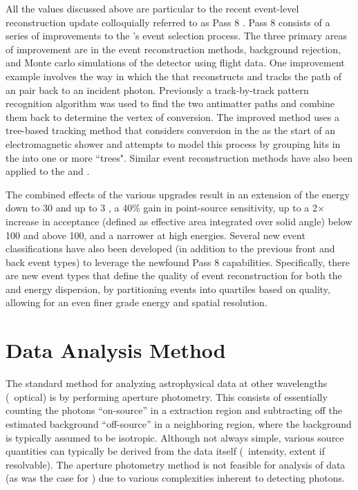 All the values discussed above are particular to the recent \lat{} event-level reconstruction update colloquially referred to as Pass 8 \citep{atwood13}. Pass 8 consists of a series of improvements to the \lat{}'s event selection process. The three primary areas of improvement are in the event reconstruction methods, background rejection, and Monte carlo simulations of the detector using flight data. One improvement example involves the way in which the that \lat{} reconstructs and tracks the path of an \ee{} pair back to an incident photon. Previously a track-by-track pattern recognition algorithm was used to find the two antimatter paths and combine them back to determine the vertex of conversion. The improved method uses a tree-based tracking method that considers conversion in the \tkr{} as the start of an electromagnetic shower and attempts to model this process by grouping hits in the \tkr{} into one or more ``trees". Similar event reconstruction methods have also been applied to the \acd{} and \calo{}. 

The combined effects of the various upgrades result in an extension of the energy down to 30\mev{} and up to 3\tev{} \cite[see Chapter \ref{chap:2FHL} for applications]{Bruel12}, a 40\% gain in point-source sensitivity, up to a 2$\times$ increase in acceptance (defined as effective area integrated over solid angle) below 100\mev{} and above 100\gev{}, and a narrower \psf{} at high energies. Several new event classifications have also been developed (in addition to the previous front and back event types) to leverage the newfound  Pass 8 \lat{} capabilities. Specifically, there are new event types that define the quality of event reconstruction for both the \psf{} and energy dispersion, by partitioning events into quartiles based on quality, allowing for an even finer grade energy and spatial resolution.




\section{\label{FGST:analysis}\FermiLat{} Data Analysis Method}
The standard method for analyzing astrophysical data at other wavelengths (\eg{}\ optical) is by performing aperture photometry. This consists of essentially counting the photons ``on-source'' in a extraction region and subtracting off the estimated background ``off-source'' in a neighboring region, where the background is typically assumed to be isotropic. Although not always simple, various source quantities can typically be derived from the data itself (\eg{}\ intensity, extent if resolvable). The aperture photometry method is not feasible for analysis of \Fermi{} data (as was the case for \egret{} \cite{mattox96}) due to various complexities inherent to detecting \gam{} photons. 

